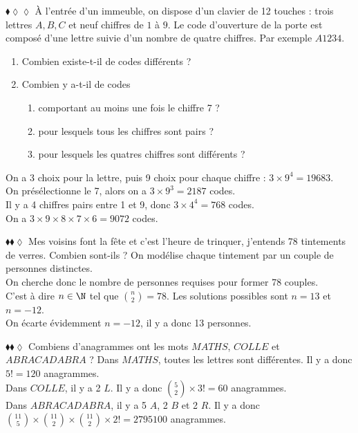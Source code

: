\documentclass[11pt]{article}
\begin{document}
\begin{exercice}{$\blacklozenge\lozenge\lozenge$}{}
    À l'entrée d'un immeuble, on dispose d'un clavier de 12 touches : trois lettres $A, B, C$ et neuf chiffres de $1$ à $9$. Le code d'ouverture de la porte est composé d'une lettre suivie d'un nombre de quatre chiffres. Par exemple $A1234$.
    \begin{enumerate}
        \item Combien existe-t-il de codes différents ?
        \item Combien y a-t-il de codes
        \begin{enumerate}
            \item comportant au moins une fois le chiffre 7 ?
            \item pour lesquels tous les chiffres sont pairs ?
            \item pour lesquels les quatres chiffres sont différents ?
        \end{enumerate}
    \end{enumerate}
    \tcblower
     On a 3 choix pour la lettre, puis 9 choix pour chaque chiffre : $3\times9^4=19683$.\\
     On présélectionne le 7, alors on a $3\times9^3=2187$ codes.\\
     Il y a 4 chiffres pairs entre 1 et 9, donc $3\times4^4=768$ codes.\\
     On a $3\times9\times8\times7\times6=9072$ codes.
\end{exercice}

\begin{exercice}{$\blacklozenge\blacklozenge\lozenge$}{}
    Mes voisins font la fête et c'est l'heure de trinquer, j'entends 78 tintements de verres. Combien sont-ils ?
    \tcblower
    On modélise chaque tintement par un couple de personnes distinctes.\\
    On cherche donc le nombre de personnes requises pour former 78 couples.\\
    C'est à dire $n\in\N$ tel que $\binom{n}{2}=78$. Les solutions possibles sont $n=13$ et $n=-12$.\\
    On écarte évidemment $n=-12$, il y a donc 13 personnes.
\end{exercice}

\begin{exercice}{$\blacklozenge\blacklozenge\lozenge$}{}
    Combiens d'anagrammes ont les mots $MATHS$, $COLLE$ et $ABRACADABRA$ ?
    \tcblower
    Dans $MATHS$, toutes les lettres sont différentes. Il y a donc $5!=120$ anagrammes.\\
    Dans $COLLE$, il y a 2 $L$. Il y a donc $\binom{5}{2}\times3!=60$ anagrammes.\\
    Dans $ABRACADABRA$, il y a 5 $A$, 2 $B$ et 2 $R$. Il y a donc $\binom{11}{5}\times\binom{11}{2}\times\binom{11}{2}\times2!=2795100$ anagrammes.
\end{exercice}
\end{document}
